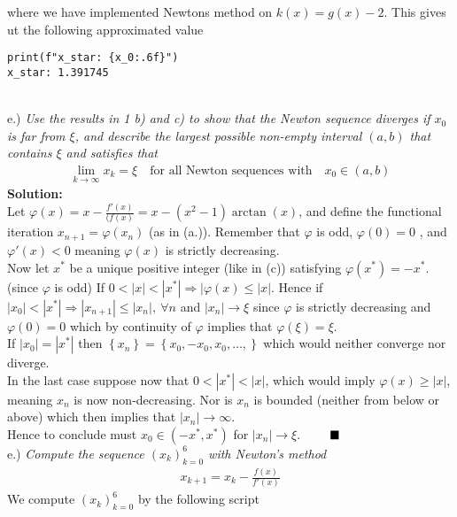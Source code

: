 \documentclass[12pt,
               a4paper,
               article,
               oneside,
               norsk,oldfontcommands]{memoir}
\newcommand{\Q}{ \qquad \hfill \blacksquare}
\newcommand{\bl}{\left\{}
\newcommand{\br}{\right\}}
\newcommand{\spaze}{\vspace{4mm}\\}
\begin{document}
where we have implemented Newtons method on $k(x) = g(x) - 2$. This gives ut the following approximated value 
\begin{verbatim}
print(f"x_star: {x_0:.6f}")
x_star: 1.391745
\end{verbatim} \spaze
e.) \emph{Use the results in 1 b) and c) to show that the Newton sequence diverges if $x_0$ is far from $\xi$, and describe the largest possible non-empty interval $(a, b)$ that contains $\xi$ and satisfies that} 
\begin{align*}
\lim_{k \to \infty} x_{k} = \xi \quad \text{for all Newton sequences with} \quad x_0 \in (a,b) 
\end{align*}
\textbf{Solution:} \spaze 
Let $\varphi (x) = x - \frac{f'(x)}{(f(x)} = x - (x^2 -1)\arctan(x)$, and define the functional iteration $x_{n+1} = \varphi(x_n)$ (as in (a.)). Remember that $\varphi$ is odd, $\varphi(0) = 0$ , and $\varphi'(x) < 0 $  meaning $\varphi(x)$ is strictly decreasing. \vspace{2mm }\\
Now let $x^{*}$ be a unique positive integer (like in (c)) satisfying $\varphi(x^{*}) = -x^{*}$. (since $\varphi$ is odd) If $ 0 < |x| < |x^{*}| \Rightarrow |\varphi(x) \leq |x|$. Hence if $|x_0| < |x^{*}| \Rightarrow |x_{n+1}| \leq |x_n|, \ \forall n$ and $|x_n| \rightarrow \xi$ since $\varphi$ is strictly decreasing and $\varphi(0) = 0$ which by continuity of $\varphi$ implies that $\varphi(\xi) = \xi$. \vspace{3mm}\\
If $|x_0| = |x^{*}|$ then $\left\{ x_n \right\} = \bl x_0, -x_0, x_0, \ldots, \br$ which would neither converge nor diverge. \vspace{3mm}\\
In the last case suppose now that $0 < |x^{*}| < |x|$, which would imply $\varphi(x) \geq |x|$, meaning $x_n$ is now non-decreasing. Nor is $x_n$ is bounded (neither from below or above) which then implies that $|x_n| \rightarrow \infty$. \vspace{3mm}\\
Hence to conclude must $x_0 \in (-x^{*}, x^{*})$ for $|x_n| \rightarrow \xi$. $\Q$ \spaze 
e.) \emph{Compute the sequence $(x_k)_{k=0}^{6}$ with Newton’s method}
\begin{align*}
x_{k+1} = x_k - \frac{f(x)}{f'(x)}
\end{align*}
We compute  $(x_k)_{k=0}^{6}$  by the following script 
\end{document}
